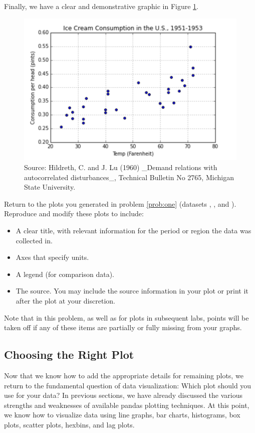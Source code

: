 Finally, we have a clear and demonstrative graphic in Figure \ref{fig:labels}.

\begin{figure}[H]
    \centering
    \includegraphics[width=.75\textwidth]{Icecream.pdf}
    \caption{Source:  Hildreth, C. and J. Lu (1960) \_Demand relations with autocorrelated disturbances\_, Technical Bulletin No 2765, Michigan State University.}
    \label{fig:labels}
\end{figure}

\begin{problem}
Return to the plots you generated in problem \ref{prob:one} (datasets , , and ).
Reproduce and modify these plots to include:
\begin{itemize}
\item A clear title, with relevant information for the period or region the data was collected in.
\item Axes that specify units.
\item A legend (for comparison data).
\item The source. You may include the source information in your plot or print it after the plot at your discretion.
\end{itemize}
Note that in this problem, as well as for plots in subsequent labs, points will be taken off if any of these items are partially or fully missing from your graphs.
\end{problem}


\subsection*{Choosing the Right Plot}
Now that we know how to add the appropriate details for remaining plots, we return to the fundamental question of data visualization: Which plot should you use for your data?
In previous sections, we have already discussed the various strengths and weaknesses of available pandas plotting techniques.
At this point, we know how to visualize data using line graphs, bar charts, histograms, box plots, scatter plots, hexbins, and lag plots.

